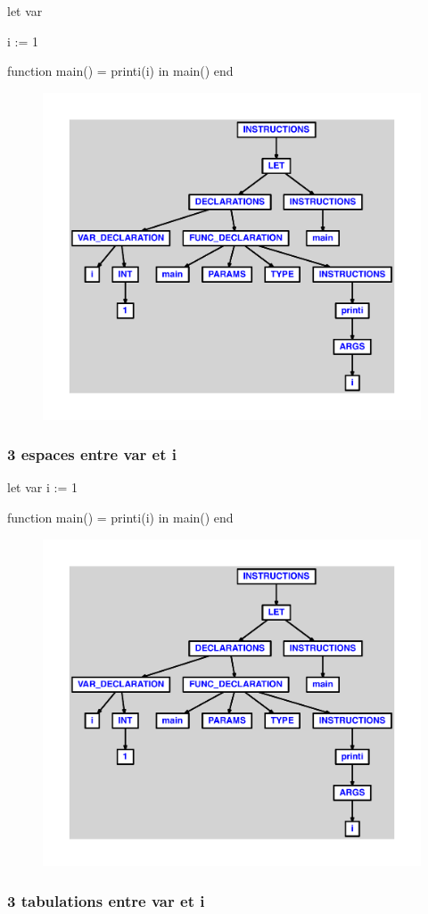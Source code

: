 \documentclass{article}
\begin{document}
\begin{verbatimtab}
let
	var

	i := 1

	function main() = printi(i)
in main() end
\end{verbatimtab}
\begin{figure}[H]\centering\includegraphics[max width=\textwidth]{ast/ast_337.pdf}\end{figure}\subsubsection{3 espaces entre var et i}
\begin{verbatimtab}
let
	var   i := 1

	function main() = printi(i)
in main() end
\end{verbatimtab}
\begin{figure}[H]\centering\includegraphics[max width=\textwidth]{ast/ast_338.pdf}\end{figure}\subsubsection{3 tabulations entre var et i}
\end{document}
